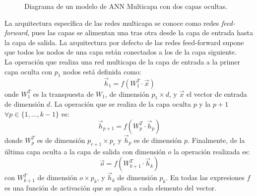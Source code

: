 \begin{figure}[ht]
    \centering
    \caption{Diagrama de un modelo de \acs{ANN} Multicapa con dos capas ocultas.}
    \label{fig:nnlayers}
\end{figure}

La arquitectura específica de las redes multicapa se conoce como redes \emph{feed-forward}, pues las capas se alimentan una tras otra desde la capa de entrada hasta la capa de salida. La arquitectura por defecto de las redes feed-forward supone que todos los nodos de una capa están conectados a los de la capa siguiente. \cite{Nielsen:2018}
\\
La operación que realiza una red multicapa de la capa de entrada a la primer capa oculta con $p_1$ nodos está definida como:
$$\vec{h}_1 = f(W^T_1 \cdot \vec{x})$$
onde $W^T_1$ es la transpuesta de $W_1$, de dimensión $p_1 \times d$, y $\vec{x}$ el vector de entrada de dimensión $d$. La operación que se realiza de la capa oculta $p$ y la $p+1$ $\forall p \in \{1,...,k-1\}$ es:
$$\vec{h}_{p+1} = f(W^T_{p} \cdot \vec{h}_p)$$
donde $W^T_{p}$ es de dimensión $p_{r+1} \times p_r$ y $\vec{h}_p$ es de dimensión $p$. Finalmente, de la última capa oculta a la capa de salida con dimensión $o$ la operación realizada es:
$$\vec{o} = f(W^T_{k+1} \cdot \vec{h}_k)$$
con $W^T_{k+1}$ de dimensión $o \times p_{k}$, y $\vec{h}_k$ de dimensión $p_k$. En todas las expresiones $f$ es una función de activación que se aplica a cada elemento del vector.

